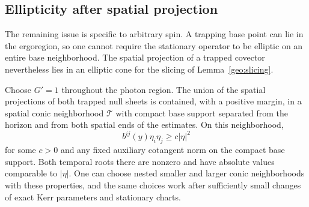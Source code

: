 \subsection{Ellipticity after spatial projection}

The remaining issue is specific to arbitrary spin.  A trapping base
point can lie in the ergoregion, so one cannot require the stationary
operator to be elliptic on an entire base neighborhood.  The spatial
projection of a trapped covector nevertheless lies in an elliptic
cone for the slicing of Lemma~\ref{geo:slicing}.

\begin{proposition}
\label{geo:projected-ellipticity}
Choose $G'=1$ throughout the photon region.  The union of the
spatial projections of both trapped null sheets is contained, with
a positive margin, in a spatial conic neighborhood $\mathcal T$
with compact base support separated from the horizon and from
both spatial ends of the estimates.  On this neighborhood,
\begin{equation}
 b^{ij}(y)\eta_i\eta_j\geq c|\eta|^2
 \label{geo:conic-ellipticity}
\end{equation}
for some $c>0$ and any fixed auxiliary cotangent norm on the
compact base support.  Both temporal roots there are nonzero and
have absolute values comparable to $|\eta|$.  One can choose nested
smaller and larger conic neighborhoods with these properties, and
the same choices work after sufficiently small changes of exact
Kerr parameters and stationary charts.
\end{proposition}

